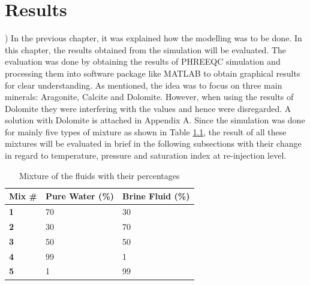 \chapter{Results}
\usepackage{float})
In the previous chapter, it was explained how the modelling was to be done. In this chapter, the results obtained from the simulation will be evaluated. The evaluation was done by obtaining the results of PHREEQC simulation and processing them into software package like MATLAB to obtain graphical results for clear understanding. 
    As mentioned, the idea was to focus on three main minerals: Aragonite, Calcite and Dolomite. However, when using the results of Dolomite they were interfering with the values and hence were disregarded. A solution with Dolomite is attached in Appendix A.
\newline
\newline
Since the simulation was done for mainly five types of mixture as shown in Table \ref{tablemix}, the result of all these mixtures will be evaluated in brief in the following subsections with their change in regard to temperature, pressure and saturation index at re-injection level.

\begin{table}[h!]
\label{tablemix}
\centering
\caption{Mixture of the fluids with their percentages}
\begin{tabular}{|l|l|l|}
\hline
\textbf{Mix \#} & \textbf{Pure Water (\%)} & \textbf{Brine Fluid (\%)} \\ \hline
\textbf{1}      & 70                       & 30                             \\ \hline
\textbf{2}      & 30                       & 70                             \\ \hline
\textbf{3}      & 50                       & 50                             \\ \hline
\textbf{4}      & 99                       & 1                              \\ \hline
\textbf{5}      & 1                        & 99                            \\ \hline

\end{tabular}
\end{table}

